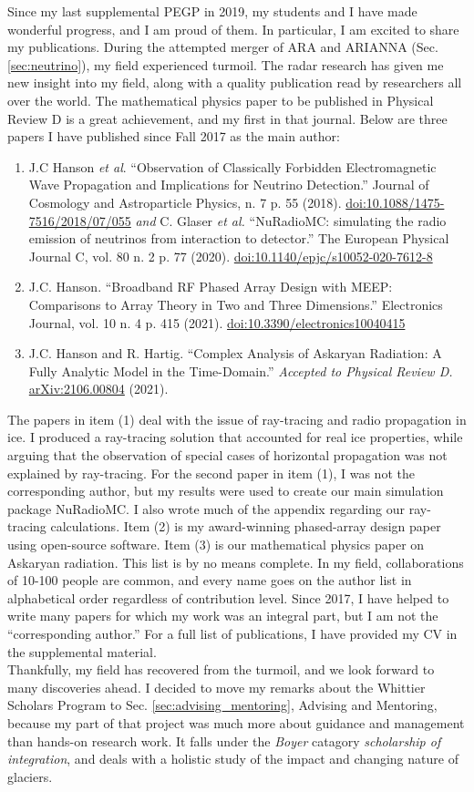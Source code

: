 \documentclass[../../main.tex]{subfiles}
\begin{document}
Since my last supplemental PEGP in 2019, my students and I have made wonderful progress, and I am proud of them.  In particular, I am excited to share my publications.  During the attempted merger of ARA and ARIANNA (Sec. \ref{sec:neutrino}), my field experienced turmoil.  The radar research has given me new insight into my field, along with a quality publication read by researchers all over the world.  The mathematical physics paper to be published in Physical Review D is a great achievement, and my first in that journal.  Below are three papers I have published since Fall 2017 as the main author:
\begin{enumerate}
\item J.C Hanson \textit{et al}.  ``Observation of Classically Forbidden Electromagnetic Wave Propagation and Implications for Neutrino Detection.''  Journal of Cosmology and Astroparticle Physics, n. 7 p. 55 (2018). \url{doi:10.1088/1475-7516/2018/07/055} \textit{and} C. Glaser \textit{et al.} ``NuRadioMC: simulating the radio emission of neutrinos from interaction to detector.'' The European Physical Journal C, vol. 80 n. 2 p. 77 (2020).  \url{doi:10.1140/epjc/s10052-020-7612-8}
\item J.C. Hanson.  ``Broadband RF Phased Array Design with MEEP: Comparisons to Array Theory in Two and Three Dimensions.''  Electronics Journal, vol. 10 n. 4 p. 415 (2021).  \url{doi:10.3390/electronics10040415}
\item J.C. Hanson and R. Hartig. ``Complex Analysis of Askaryan Radiation: A Fully Analytic Model in the Time-Domain.'' \textit{Accepted to Physical Review D.} \url{arXiv:2106.00804} (2021).
\end{enumerate}
The papers in item (1) deal with the issue of ray-tracing and radio propagation in ice.  I produced a ray-tracing solution that accounted for real ice properties, while arguing that the observation of special cases of horizontal propagation was not explained by ray-tracing.  For the second paper in item (1), I was not the corresponding author, but my results were used to create our main simulation package NuRadioMC.  I also wrote much of the appendix regarding our ray-tracing calculations.  Item (2) is my award-winning phased-array design paper using open-source software.  Item (3) is our mathematical physics paper on Askaryan radiation.  This list is by no means complete.  In my field, collaborations of 10-100 people are common, and every name goes on the author list in alphabetical order regardless of contribution level.  Since 2017, I have helped to write many papers for which my work was an integral part, but I am not the ``corresponding author.''  For a full list of publications, I have provided my CV in the supplemental material.
\\
\vspace{0.25cm}
Thankfully, my field has recovered from the turmoil, and we look forward to many discoveries ahead.  I decided to move my remarks about the Whittier Scholars Program to Sec. \ref{sec:advising_mentoring}, Advising and Mentoring, because my part of that project was much more about guidance and management than hands-on research work.  It falls under the \textit{Boyer} catagory \textit{scholarship of integration}, and deals with a holistic study of the impact and changing nature of glaciers.
\end{document}
